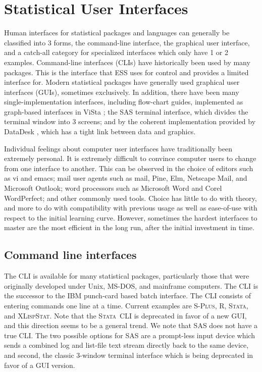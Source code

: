 \documentclass{article}
\newcommand*{\Splus}{\textsc{S-Plus}}
\newcommand*{\XLispStat}{\textsc{XLispStat}}
\newcommand*{\Stata}{\textsc{Stata}}
\begin{document}
\section{Statistical User Interfaces}
\label{sec:UI}

Human interfaces for statistical packages and languages can generally
be classified into 3 forms, the command-line interface, the graphical
user interface, and a catch-all category for specialized interfaces
which only have 1 or 2 examples.  Command-line interfaces (CLIs) have
historically been used by many packages.  This is the interface that
ESS uses for control and provides a limited interface for.  Modern
statistical packages have generally used graphical user interfaces
(GUIs), sometimes exclusively.  In addition, there have been many
single-implementation interfaces, including flow-chart guides,
implemented as graph-based interfaces in ViSta \citep{youn:lubi:1995};
the SAS terminal interface, which divides the terminal window into 3
screens; and by the coherent implementation provided by DataDesk
\citep{vell:prat:1989}, which has a tight link between data and
graphics.

Individual feelings about computer user interfaces have traditionally
been extremely personal.  It is extremely difficult to convince
computer users to change from one interface to another.  This can be
observed in the choice of editors such as vi and emacs; mail user agents
such as mail, Pine, Elm, Netscape Mail, and Microsoft Outlook; word
processors such as Microsoft Word and Corel WordPerfect; and other
commonly used tools.  Choice has little to do with theory, and more to
do with compatibility with previous usage as well as ease-of-use with
respect to the initial learning curve.  However, sometimes the hardest
interfaces to master are the most efficient in the long run, after the
initial investment in time.

\subsection{Command line interfaces}
\label{sec:UI:command}

The CLI is available for many statistical packages, particularly those
that were originally developed under Unix, MS-DOS, and
mainframe computers.  The CLI is the successor to the IBM punch-card
based batch interface.  The CLI consists of entering
commands one line at a time.  Current examples
are \Splus, R, \Stata, and \XLispStat.  Note that
the \Stata\ CLI is deprecated in favor of a new GUI, and this
direction seems to be a general trend.  We note that SAS does not have
a true CLI.  The two possible options for SAS are a prompt-less input
device which sends a combined log and list-file text stream directly
back to the same device, and second, the classic 3-window %
terminal interface which is being deprecated in favor of a GUI
version.
\end{document}
